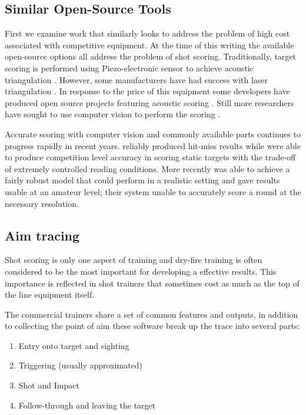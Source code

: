 \documentclass[conference]{IEEEtran}
\begin{document}
\subsection{Similar Open-Source Tools}

First we examine work that similarly looks to address the problem of high cost associated with competitive equipment.
At the time of this writing the available open-source options all address the problem of shot scoring.
Traditionally, target scoring is performed using Piezo-electronic sensor to achieve acoustic triangulation \cite{Anderson2018}.
However, some manufacturers have had success with laser triangulation \cite{SUIS}.
In response to the price of this equipment some developers have produced open source projects featuring acoustic scoring \cite{etarg, freetarget}.
Still more researchers have sought to use computer vision to perform the scoring \cite{Rudzinski2012, Stenhager2021}.

Accurate scoring with computer vision and commonly available parts continues to progress rapidly in recent years.
\cite{Ye2011} reliably produced  hit-miss results while \cite{Rudzinski2012} were able to produce competition level accuracy in scoring static targets with the trade-off of extremely controlled reading conditions.
More recently \cite{Stenhager2021} was able to achieve a fairly robust model that could perform in a realistic setting and gave results usable at an amateur level; their system unable to accurately score a round at the necessary resolution.

\subsection{Aim tracing}

Shot scoring is only one aspect of training and dry-fire training is often 
considered to be the most important for developing a effective results.
\cite{Potter2017}
This importance is reflected in shot trainers that sometimes cost as much as the top of the line equipment itself.
\cite{scatt, noptel}

The commercial trainers share a set of common features and outputs,
in addition to collecting the point of aim these software break up the trace into several parts:
\begin{enumerate}
	\item Entry onto target and sighting
	\item Triggering (usually approximated)
	\item Shot and Impact
	\item Follow-through and leaving the target
\end{enumerate}
\end{document}
